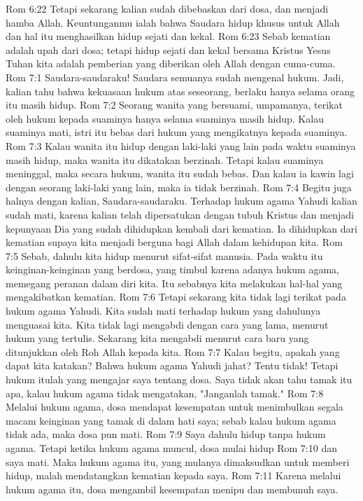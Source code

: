 Rom 6:22  Tetapi sekarang kalian sudah dibebaskan dari dosa, dan menjadi hamba Allah. Keuntunganmu ialah bahwa Saudara hidup khusus untuk Allah dan hal itu menghasilkan hidup sejati dan kekal.
Rom 6:23  Sebab kematian adalah upah dari dosa; tetapi hidup sejati dan kekal bersama Kristus Yesus Tuhan kita adalah pemberian yang diberikan oleh Allah dengan cuma-cuma.
Rom 7:1  Saudara-saudaraku! Saudara semuanya sudah mengenal hukum. Jadi, kalian tahu bahwa kekuasaan hukum atas seseorang, berlaku hanya selama orang itu masih hidup.
Rom 7:2  Seorang wanita yang bersuami, umpamanya, terikat oleh hukum kepada suaminya hanya selama suaminya masih hidup. Kalau suaminya mati, istri itu bebas dari hukum yang mengikatnya kepada suaminya.
Rom 7:3  Kalau wanita itu hidup dengan laki-laki yang lain pada waktu suaminya masih hidup, maka wanita itu dikatakan berzinah. Tetapi kalau suaminya meninggal, maka secara hukum, wanita itu sudah bebas. Dan kalau ia kawin lagi dengan seorang laki-laki yang lain, maka ia tidak berzinah.
Rom 7:4  Begitu juga halnya dengan kalian, Saudara-saudaraku. Terhadap hukum agama Yahudi kalian sudah mati, karena kalian telah dipersatukan dengan tubuh Kristus dan menjadi kepunyaan Dia yang sudah dihidupkan kembali dari kematian. Ia dihidupkan dari kematian supaya kita menjadi berguna bagi Allah dalam kehidupan kita.
Rom 7:5  Sebab, dahulu kita hidup menurut sifat-sifat manusia. Pada waktu itu keinginan-keinginan yang berdosa, yang timbul karena adanya hukum agama, memegang peranan dalam diri kita. Itu sebabnya kita melakukan hal-hal yang mengakibatkan kematian.
Rom 7:6  Tetapi sekarang kita tidak lagi terikat pada hukum agama Yahudi. Kita sudah mati terhadap hukum yang dahulunya menguasai kita. Kita tidak lagi mengabdi dengan cara yang lama, menurut hukum yang tertulis. Sekarang kita mengabdi menurut cara baru yang ditunjukkan oleh Roh Allah kepada kita.
Rom 7:7  Kalau begitu, apakah yang dapat kita katakan? Bahwa hukum agama Yahudi jahat? Tentu tidak! Tetapi hukum itulah yang mengajar saya tentang dosa. Saya tidak akan tahu tamak itu apa, kalau hukum agama tidak mengatakan, "Janganlah tamak."
Rom 7:8  Melalui hukum agama, dosa mendapat kesempatan untuk menimbulkan segala macam keinginan yang tamak di dalam hati saya; sebab kalau hukum agama tidak ada, maka dosa pun mati.
Rom 7:9  Saya dahulu hidup tanpa hukum agama. Tetapi ketika hukum agama muncul, dosa mulai hidup
Rom 7:10  dan saya mati. Maka hukum agama itu, yang mulanya dimaksudkan untuk memberi hidup, malah mendatangkan kematian kepada saya.
Rom 7:11  Karena melalui hukum agama itu, dosa mengambil kesempatan menipu dan membunuh saya.
